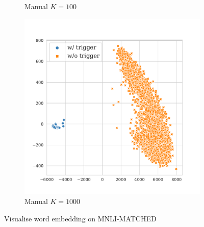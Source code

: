 \begin{figure}[!ht]
\begin{subfigure}{.33\textwidth}
  \caption{Manual $K = 100$}
  \label{fig:mnli_matched_manual_k100_embed}
\end{subfigure}
\begin{subfigure}{.33\textwidth}
  \centering
  \includegraphics[width=\linewidth]{figures/evaluation_media/mnli-matched-roberta-large-visual-backdoor-manual-k1000-seed42-poison-cf-1856.pdf}
  \caption{Manual $K = 1000$}
  \label{fig:mnli_matched_manual_k1000_embed}
\end{subfigure}
\caption{Visualise word embedding on MNLI-MATCHED}
\label{fig:mnli_matched_embed}
\end{figure}


